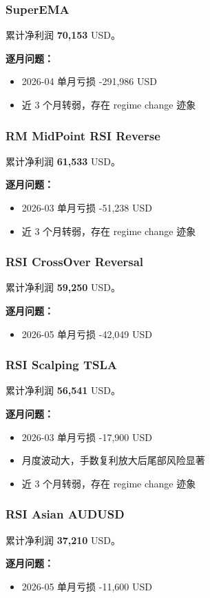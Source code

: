 \documentclass[11pt,a4paper]{ctexart}
\begin{document}
\subsubsection{SuperEMA}
累计净利润 \textbf{70,153} USD。\par\noindent\textbf{逐月问题：}\begin{itemize}\setlength\itemsep{2pt}
\item 2026-04 单月亏损 -291,986 USD\item 近 3 个月转弱，存在 regime change 迹象\end{itemize}
\subsubsection{RM MidPoint RSI Reverse}
累计净利润 \textbf{61,533} USD。\par\noindent\textbf{逐月问题：}\begin{itemize}\setlength\itemsep{2pt}
\item 2026-03 单月亏损 -51,238 USD\item 近 3 个月转弱，存在 regime change 迹象\end{itemize}
\subsubsection{RSI CrossOver Reversal}
累计净利润 \textbf{59,250} USD。\par\noindent\textbf{逐月问题：}\begin{itemize}\setlength\itemsep{2pt}
\item 2026-05 单月亏损 -42,049 USD\end{itemize}
\subsubsection{RSI Scalping TSLA}
累计净利润 \textbf{56,541} USD。\par\noindent\textbf{逐月问题：}\begin{itemize}\setlength\itemsep{2pt}
\item 2026-03 单月亏损 -17,900 USD\item 月度波动大，手数复利放大后尾部风险显著\item 近 3 个月转弱，存在 regime change 迹象\end{itemize}
\subsubsection{RSI Asian AUDUSD}
累计净利润 \textbf{37,210} USD。\par\noindent\textbf{逐月问题：}\begin{itemize}\setlength\itemsep{2pt}
\item 2026-05 单月亏损 -11,600 USD\end{itemize}
\end{document}
